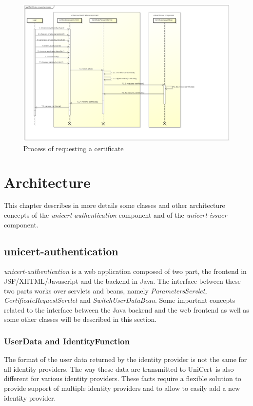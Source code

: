 \documentclass[oneside]{scrreprt}
\newcommand{\unicert}{\mbox{UniCert}}
\begin{document}
\begin{figure}[ht]
\centerline{
\includegraphics[width=1.0\textwidth]{figs/certificate_request_process}}
\caption{Process of requesting a certificate}
\label{fig:request_process}
\end{figure}

\chapter{Architecture} \label{chap:architecture}
This chapter describes in more details some classes and other architecture concepts of the \textit{unicert-authentication} component and of the \textit{unicert-issuer} component.

\section{unicert-authentication}

\textit{unicert-authentication} is a web application composed of two part, the frontend in JSF/XHTML/Javascript and the backend in Java. The interface between these two parts works over servlets and beans, namely \textit{ParametersServlet}, \textit{CertificateRequestServlet} and \textit{SwitchUserDataBean}. Some important concepts related to the interface between the Java backend and the web frontend as well as some other classes will be described in this section.

\subsection{UserData and IdentityFunction}

The format of the user data returned by the identity provider is not the same for all identity providers. The way these data are transmitted to \unicert\ is also different for various identity providers. These facts require a flexible solution to provide support of multiple identity providers and to allow to easily add a new identity provider.
\end{document}
